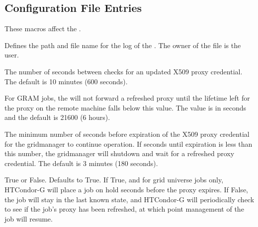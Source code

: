 \subsection{\label{sec:Gridmanager-Config-File-Entries}
Configuration File Entries}

These macros affect the .
\begin{description}

\label{param:GridmanagerLog}
\item[\Macro{GRIDMANAGER\_LOG}]
  Defines the path and file name for the log of the . 
  The owner of the file is the  user.

\label{param:GridmanagerCheckproxyInterval}
\item[\Macro{GRIDMANAGER\_CHECKPROXY\_INTERVAL}]
  The number of seconds
  between checks for an updated X509 proxy credential. The default
  is 10 minutes (600 seconds).

\label{param:GridmanagerProxyRefreshTime}
\item[\Macro{GRIDMANAGER\_PROXY\_REFRESH\_TIME}]
  For GRAM jobs, the  will not forward a refreshed
  proxy until the lifetime left for the proxy on the remote machine
  falls below this value.
  The value is in seconds and the default is 21600 (6 hours).

\label{param:GridmanagerMinimumProxyTime}
\item[\Macro{GRIDMANAGER\_MINIMUM\_PROXY\_TIME}]
  The minimum number of
  seconds before expiration of the X509 proxy credential for the
  gridmanager to continue operation. If seconds until expiration is
  less than this number, the gridmanager will shutdown and wait for
  a refreshed proxy credential. The default is 3 minutes (180 seconds).

\label{param:HoldJobIfCredentialExpires}
\item[\Macro{HOLD\_JOB\_IF\_CREDENTIAL\_EXPIRES}]
  True or False.  Defaults to True.
  If True, and for grid universe jobs only,
  HTCondor-G will place a job on hold
   seconds
  before the proxy expires.
  If False,
  the job will stay in the last known state,
  and HTCondor-G will periodically check to see if the job's proxy has been
  refreshed, at which point management of the job will resume.


\end{description}
